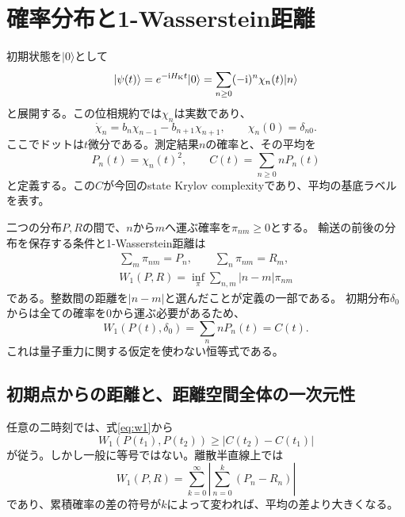 \documentclass[a4paper,11pt]{ltjsarticle}
\numberwithin{equation}{section}
\newcommand{\ket}[1]{\lvert #1\rangle}
\newcommand{\ii}{\mathrm{i}}
\begin{document}
\section{確率分布と1-Wasserstein距離}
初期状態を$\ket0$として
\begin{equation}
 \ket{\psi(t)}=e^{-\ii H_{\rm K}t}\ket0
 =\sum_{n\geq0}(-\ii)^n\chi_n(t)\ket n
 \label{eq:state}
\end{equation}
と展開する。この位相規約では$\chi_n$は実数であり、
\begin{equation}
 \dot\chi_n=b_n\chi_{n-1}-b_{n+1}\chi_{n+1},\qquad
 \chi_n(0)=\delta_{n0}.
 \label{eq:evolution}
\end{equation}
ここでドットは$t$微分である。測定結果$n$の確率と、その平均を
\begin{equation}
 P_n(t)=\chi_n(t)^2,\qquad
 C(t)=\sum_{n\geq0}nP_n(t)
 \label{eq:complexity}
\end{equation}
と定義する。この$C$が今回のstate Krylov complexityであり、平均の基底ラベルを表す。

二つの分布$P,R$の間で、$n$から$m$へ運ぶ確率を$\pi_{nm}\geq0$とする。
輸送の前後の分布を保存する条件と1-Wasserstein距離は
\begin{align}
 \sum_m\pi_{nm}=P_n,
 \qquad \sum_n\pi_{nm}=R_m,
 \label{eq:coupling}\\
 W_1(P,R)=\inf_\pi\sum_{n,m}|n-m|\pi_{nm}
 \label{eq:w1}
\end{align}
である。整数間の距離を$|n-m|$と選んだことが定義の一部である。
初期分布$\delta_0$からは全ての確率を$0$から運ぶ必要があるため、
\begin{equation}
 W_1(P(t),\delta_0)=\sum_n nP_n(t)=C(t).
 \label{eq:w1equalsc}
\end{equation}
これは量子重力に関する仮定を使わない恒等式である。

\subsection{初期点からの距離と、距離空間全体の一次元性}
任意の二時刻では、式\eqref{eq:w1}から
\begin{equation}
 W_1(P(t_1),P(t_2))\geq|C(t_2)-C(t_1)|
 \label{eq:meanbound}
\end{equation}
が従う。しかし一般に等号ではない。離散半直線上では
\begin{equation}
 W_1(P,R)=\sum_{k=0}^{\infty}
 \left|\sum_{n=0}^k(P_n-R_n)\right|
 \label{eq:cdf}
\end{equation}
であり、累積確率の差の符号が$k$によって変われば、平均の差より大きくなる。
\end{document}
